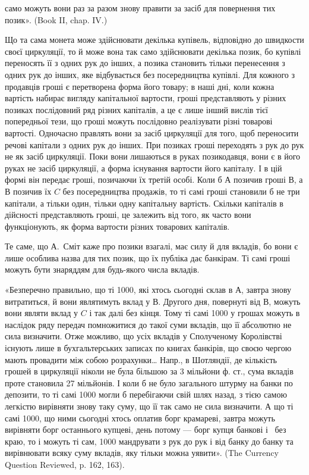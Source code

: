\parcont{}  %
само можуть вони раз за разом знову правити за засіб для повернення тих
позик». (Book II, chap. IV.)

Що та сама монета може здійснювати декілька купівель, відповідно до швидкости
своєї циркуляції, то й може вона так само здійснювати декілька позик, бо купівлі
переносять її з одних рук до інших, а позика становить тільки перенесення з одних
рук до інших, яке відбувається без посередництва купівлі. Для кожного з продавців
гроші є перетворена форма його товару; в наші дні, коли кожна вартість набирає
вигляду капітальної вартости, гроші представляють у різних позиках послідовний
ряд різних капіталів, а це є лише інший вислів тієї попередньої тези, що гроші
можуть послідовно реалізувати різні товарові вартості. Одночасно правлять
вони за засіб циркуляції для того, щоб переносити речові капітали з одних рук до
інших. При позиках гроші переходять з рук до рук не як засіб циркуляції. Поки
вони лишаються в руках позикодавця, вони є в його руках не засіб циркуляції, а
форма існування вартости його капіталу. І в цій формі він передає гроші, позичаючи
їх третій особі. Коли б $А$ позичив гроші $В$, а $В$ позичив їх $C$ без
посередництва продажів, то ті самі гроші становили б не три капітали, а тільки
один, тільки одну капітальну вартість. Скільки капіталів в дійсності представляють
гроші, це залежить від того, як часто вони функціонують, як форма
вартости різних товарових капіталів.

Те саме, що А.~Сміт каже про позики взагалі, має силу й для вкладів,
бо вони є лише особлива назва для тих позик, що їх публіка дає банкірам.
Ті самі гроші можуть бути знаряддям для будь-якого числа вкладів.

«Безперечно правильно, що ті 1000, які хтось сьогодні склав в $А$,
завтра знову витратиться, й вони являтимуть вклад у $В$. Другого дня, повернуті
від $В$, можуть вони являти вклад у $C$ і так далі без кінця. Тому ті самі
1000 у грошах можуть в наслідок ряду передач помножитися до такої
суми вкладів, що її абсолютно не сила визначити. Отже можливо, що  усіх
вкладів у Сполученому Королівстві існують лише в бухгальтерських записах
по книгах банкірів, що своєю чергою мають провадити між собою розрахунки\dots{}
Напр., в Шотляндії, де кількість грошей в циркуляції ніколи не була більшою
за 3 мільйони ф. ст., сума вкладів проте становила 27 мільйонів. І коли б не
було загального штурму на банки по депозити, то ті самі 1000 могли б
перебігаючи свій шлях назад, з тією самою легкістю вирівняти знову таку суму,
що її так само не сила визначити. А що ті самі 1000, що ними сьогодні
хтось оплатив борг крамареві, завтра можуть вирівняти борг останнього купцеві,
день потому — борг купця банкові і~ без краю, то і можуть ті сам,
1000 мандрувати з рук до рук і від банку до банку та вирівнювати
всяку суму вкладів, яку тільки можна уявити». (The Currency Question Reviewed,
p. 162, 163).

